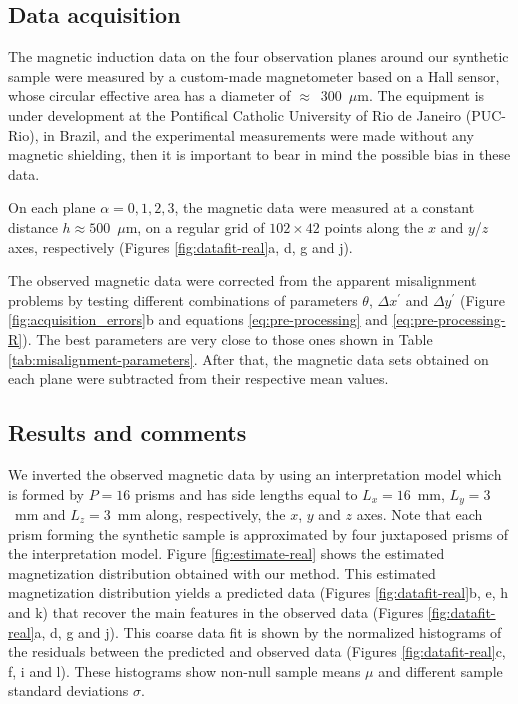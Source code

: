\documentclass[draft,gc]{agutex}
\begin{document}
\begin{article}
\subsection{Data acquisition}
\label{subsec:Data acquisition and pre-processing}

The magnetic induction data on the four observation planes
around our synthetic sample were measured by a custom-made
magnetometer based on a Hall sensor, whose circular
effective area has a diameter of $\approx$~$300$~$\mu$m.
The equipment is under development at the Pontifical Catholic 
University of Rio de Janeiro (PUC-Rio), in Brazil, and
the experimental measurements were made without any 
magnetic shielding, then it is important to bear in mind 
the possible bias in these data.

On each plane $\alpha = 0, 1, 2, 3$, the magnetic data were 
measured at a constant distance $h \approx 500$~$\mu$m, on
a regular grid of $102 \times 42$ points along the $x$ and 
$y$/$z$ axes, respectively (Figures \ref{fig:datafit-real}a,
d, g and j).

The observed magnetic data were corrected from the 
apparent misalignment 
problems by testing different combinations of parameters
$\theta$, $\Delta x^{\prime}$ and $\Delta y^{\prime}$
(Figure \ref{fig:acquisition_errors}b and equations
\ref{eq:pre-processing} and \ref{eq:pre-processing-R}).
The best parameters are very close to those ones
shown in Table \ref{tab:misalignment-parameters}.
After that, the magnetic data sets obtained on each plane were
subtracted from their respective mean values.

\subsection{Results and comments}
\label{subsec:Results and comments}

We inverted the observed magnetic data by using an
interpretation model which is formed by $P = 16$ prisms
and has side lengths equal to $L_{x} = 16$~mm, $L_{y} = 3$~mm 
and $L_{z} = 3$~mm along, respectively, the $x$, $y$ and 
$z$ axes.
Note that each prism forming the synthetic sample is 
approximated by four juxtaposed prisms of the 
interpretation model.
Figure \ref{fig:estimate-real} shows the estimated
magnetization distribution obtained with our method.
This estimated magnetization distribution yields a predicted data
(Figures \ref{fig:datafit-real}b, e, h and k) that recover
the main features in the observed data (Figures \ref{fig:datafit-real}a, 
d, g and j).
This coarse data fit is shown by the normalized histograms of 
the residuals between the predicted and
observed data (Figures \ref{fig:datafit-real}c, f, i and l).
These histograms show non-null sample means $\mu$ and 
different sample standard deviations $\sigma$.


\end{article}
\end{document}

